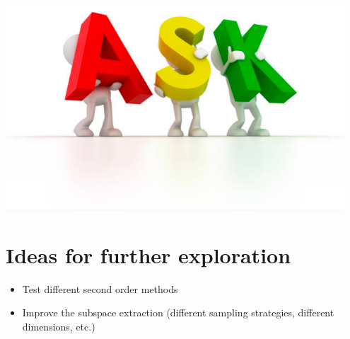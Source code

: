 \documentclass[t]{beamer}
\begin{document}

\section{}

\begin{frame}

\begin{center}

 \\
\ \\

\includegraphics[width=0.95\textwidth]{ask}

\end{center}

\end{frame}


\section{Ideas for further exploration}

\begin{frame}
\begin{itemize}
\item Test different second order methods
\item Improve the subspace extraction (different sampling strategies, different dimensions, etc.) \vspace{2cm}
\end{itemize}
 \\
\end{frame}

\end{document}
